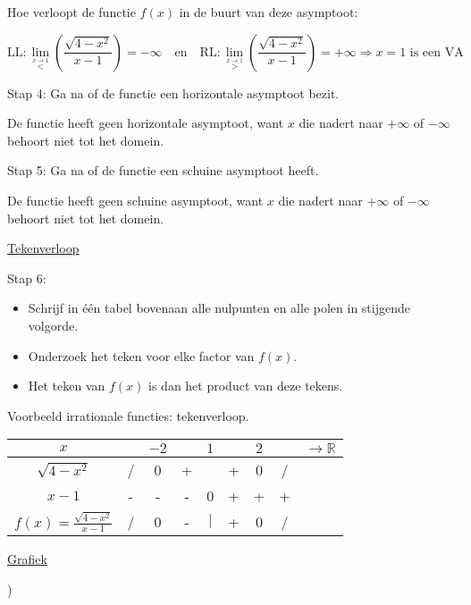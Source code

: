 \begin{voorbeeld}
Hoe verloopt de functie $f(x)$ in de buurt van deze asymptoot:

\begin{equation*}
\textrm{LL}:\lim_{\overset{x\rightarrow1}{<}}\left(\frac{\sqrt{4-x^{2}}}{x-1}\right)=-\infty\quad\textrm{en}\quad \textrm{RL}:\lim_{\overset{x\rightarrow1}{>}}\left(\frac{\sqrt{4-x^{2}}}{x-1}\right)=+\infty \Rightarrow x=1 \text{ is een VA}
\end{equation*}


Stap 4: Ga na of de functie een horizontale asymptoot bezit.

De functie heeft geen horizontale asymptoot, want $x$ die nadert
naar $+\infty$ of $-\infty$ behoort niet tot het domein.

Stap 5: Ga na of de functie een schuine asymptoot heeft.

De functie heeft geen schuine asymptoot, want $x$ die nadert naar
$+\infty$ of $-\infty$ behoort niet tot het domein.

\underline{Tekenverloop}

Stap 6:
\begin{itemize}
\item Schrijf in \'e\'en tabel bovenaan alle nulpunten en alle polen
	in stijgende volgorde. 
\item Onderzoek het teken voor elke factor van $f(x)$. 
\item Het teken van $f(x)$ is dan het product van deze tekens.
\end{itemize}


\begin{tabel}{Voorbeeld irrationale functies: tekenverloop.}
\begin{tabular}{c|cccccccc}
$x$ &  & $-2$ &  & $1$ &  & $2$ &  & $\longrightarrow\mathbb{R}$\\
\hline  
$\sqrt{4-x^{2}}$ & / & 0 & + &  & + & 0 & / & \\
$x-1$ & - & - & - & 0 & + & + & + & \\
\hline 
$f(x)=\frac{\sqrt{4-x^{2}}}{x-1}$ & / & 0 & - & $\mid$ & + & 0 & / & \\
\end{tabular}
\label{tab:irrattk}
\end{tabel}

\underline{Grafiek}


\begin{figure}[h]
		
\end{figure})


\end{voorbeeld}

